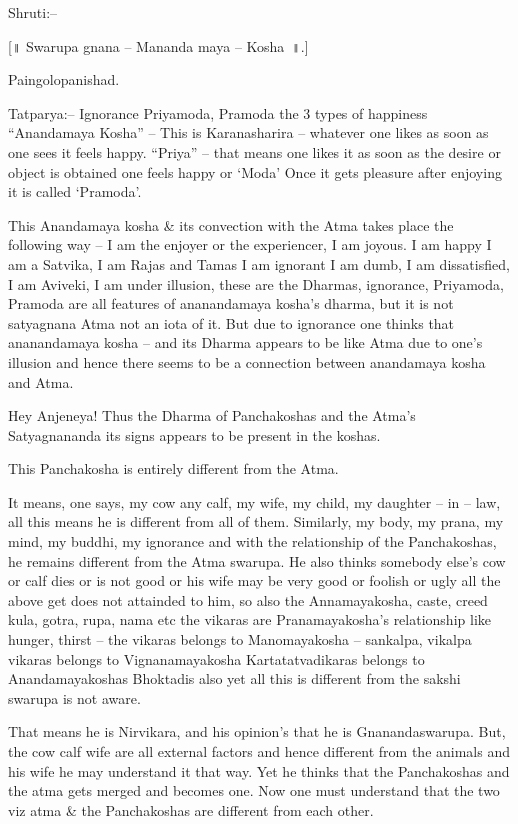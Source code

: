 Shruti:–

[॥ Swarupa gnana – Mananda maya – Kosha~॥.]

Paingolopanishad.

Tatparya:– Ignorance Priyamoda, Pramoda the 3 types of happiness “Anandamaya Kosha” – This is Karanasharira – whatever one likes as soon as one sees it feels happy. “Priya” – that means one likes it as soon as the desire or object is obtained one feels happy or ‘Moda’ Once it gets pleasure after enjoying it is called ‘Pramoda’.

This Anandamaya kosha \& its convection with the Atma takes place the following way – I am the enjoyer or the experiencer, I am joyous. I am happy I am a Satvika, I am Rajas and Tamas I am ignorant I am dumb, I am dissatisfied, I am Aviveki, I am under illusion, these are the Dharmas, ignorance, Priyamoda, Pramoda are all features of ananandamaya kosha's dharma, but it is not satyagnana Atma not an iota of it. But due to ignorance one thinks that ananandamaya kosha – and its Dharma appears to be like Atma due to one's illusion and hence there seems to be a connection between anandamaya kosha and Atma.

Hey Anjeneya! Thus the Dharma of Panchakoshas and the Atma's Satyagnananda its signs appears to be present in the koshas.

This Panchakosha is entirely different from the Atma.

It means, one says, my cow any calf, my wife, my child, my daughter – in – law, all this means he is different from all of them. Similarly, my body, my prana, my mind, my buddhi, my ignorance and with the relationship of the Panchakoshas, he remains different from the Atma swarupa. He also thinks somebody else's cow or calf dies or is not good or his wife may be very good or foolish or ugly all the above get does not attainded to him, so also the Annamayakosha, caste, creed kula, gotra, rupa, nama etc the vikaras are Pranamayakosha's relationship like hunger, thirst – the vikaras belongs to Manomayakosha – sankalpa, vikalpa vikaras belongs to Vignanamayakosha Kartatatvadikaras belongs to Anandamayakoshas Bhoktadis also yet all this is different from the sakshi swarupa is not aware.

That means he is Nirvikara, and his opinion's that he is Gnanandaswarupa. But, the cow calf wife are all external factors and hence different from the animals and his wife he may understand it that way. Yet he thinks that the Panchakoshas and the atma gets merged and becomes one. Now one must understand that the two viz atma \& the Panchakoshas are different from each other.

